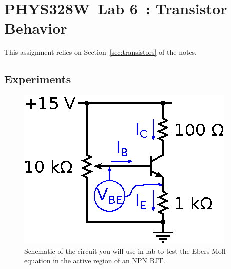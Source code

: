 \documentclass[11pt]{article}
\newcommand{\COURSE}{PHYS328W}
\newcommand{\LABNUM}{6}
\newcommand{\TITLE}{Transistor Behavior}
\begin{document}
\thispagestyle{empty}

\section*{\COURSE\ Lab \LABNUM\ : \TITLE}

This assignment relies on Section~\ref{sec:transistors} of the notes.

\subsection*{Experiments}

\begin{figure}[ht]
  \begin{center}
    \includegraphics{ebersmollcircuit.eps}
    \caption{Schematic of the circuit you will use in lab to
      test the Ebers-Moll equation in the active region of an NPN
      BJT.}
    \label{fig:ebersmollcircuitlab}
  \end{center}
\end{figure}
\end{document}

